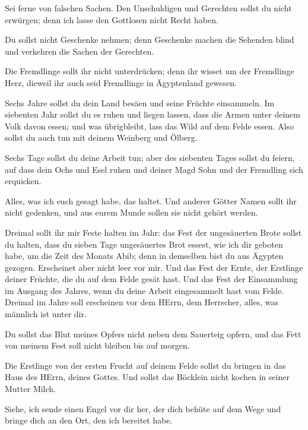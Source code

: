  Sei ferne von falschen Sachen. Den Unschuldigen und
Gerechten sollst du nicht erwürgen; denn ich lasse den Gottlosen nicht
Recht haben.

 Du sollst nicht Geschenke nehmen; denn Geschenke machen die
Sehenden blind und verkehren die Sachen der Gerechten.

 Die Fremdlinge sollt ihr nicht unterdrücken; denn ihr
wisset um der Fremdlinge Herz, dieweil ihr auch seid Fremdlinge in
Ägyptenland gewesen.

 Sechs Jahre sollst du dein Land besäen und seine Früchte
einsammeln.  Im siebenten Jahr sollst du es ruhen und
liegen lassen, dass die Armen unter deinem Volk davon essen; und was
übrigbleibt, lass das Wild auf dem Felde essen. Also sollst du auch tun
mit deinem Weinberg und Ölberg.

 Sechs Tage sollst du deine Arbeit tun; aber des siebenten
Tages sollst du feiern, auf dass dein Ochs und Esel ruhen und deiner
Magd Sohn und der Fremdling sich erquicken.

 Alles, was ich euch gesagt habe, das haltet. Und anderer
Götter Namen sollt ihr nicht gedenken, und aus eurem Munde sollen sie
nicht gehört werden.

 Dreimal sollt ihr mir Feste halten im Jahr: 
das Fest der ungesäuerten Brote sollst du halten, dass du sieben Tage
ungesäuertes Brot essest, wie ich dir geboten habe, um die Zeit des
Monats Abib; denn in demselben bist du aus Ägypten gezogen. Erscheinet
aber nicht leer vor mir.  Und das Fest der Ernte, der
Erstlinge deiner Früchte, die du auf dem Felde gesät hast. Und das Fest
der Einsammlung im Ausgang des Jahres, wenn du deine Arbeit eingesammelt
hast vom Felde.  Dreimal im Jahre soll erscheinen vor dem
HErrn, dem Herrscher, alles, was männlich ist unter dir.

 Du sollst das Blut meines Opfers nicht neben dem Sauerteig
opfern, und das Fett von meinem Fest soll nicht bleiben bis auf morgen.

 Die Erstlinge von der ersten Frucht auf deinem Felde
sollst du bringen in das Haus des HErrn, deines Gottes. Und sollst das
Böcklein nicht kochen in seiner Mutter Milch.

 Siehe, ich sende einen Engel vor dir her, der dich behüte
auf dem Wege und bringe dich an den Ort, den ich bereitet habe.

